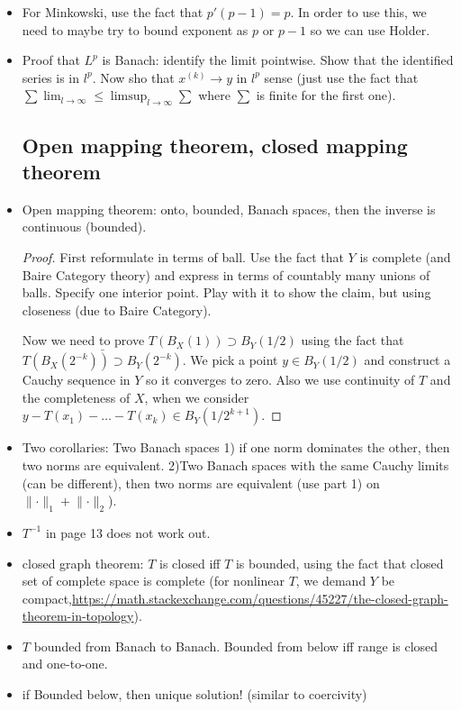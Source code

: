 \documentclass{article}
\theoremstyle{remark}
\begin{document}
\begin{itemize}
\item For Minkowski, use the fact that $p'(p-1)=p$. In order to use this, we need to maybe try to bound exponent as $p$ or $p-1$ so we can use Holder.

\item Proof that $L^p$ is Banach: identify the limit pointwise. Show that the identified series is in $l^p$. Now sho that $x^{(k)}\to y$ in $l^p$ sense (just use the fact that $\sum \lim_{l\to\infty}\leq\limsup_{l\to\infty}\sum$ where $\sum$ is finite for the first one).
\subsection*{Open mapping theorem, closed mapping theorem}
\item Open mapping theorem: onto, bounded, Banach spaces, then the inverse is continuous (bounded).
\begin{proof}
First reformulate in terms of ball. Use the fact that $Y$ is complete (and Baire Category theory) and express in terms of countably many unions of balls. Specify one interior point. Play with it to show the claim, but using closeness (due to Baire Category).

Now we need to prove $T(B_X (1))\supset B_Y(1/2)$ using the fact that $\bar{T(B_X(2^{-k}))\supset B_Y(2^{-k})}$. We pick a point $y\in B_Y(1/2)$ and construct a Cauchy sequence in $Y$ so it converges to zero. Also we use continuity of $T$ and the completeness of $X$, when we consider $y-T(x_1)-\dots-T(x_k)\in B_Y(1/2^{k+1})$.
\end{proof}
\item Two corollaries: Two Banach spaces 1) if one norm dominates the other, then two norms are equivalent. 2)Two Banach spaces with the same Cauchy limits (can be different), then two norms are equivalent (use part 1) on $\lVert\cdot\rVert_1+\lVert\cdot\rVert_2$). 
\item $T^{-1}$ in page 13 does not work out.
\item closed graph theorem: $T$ is closed iff $T$ is bounded, using the fact that closed set of complete space is complete (for nonlinear $T$, we demand $Y$ be compact,\url{https://math.stackexchange.com/questions/45227/the-closed-graph-theorem-in-topology}).
\item $T$ bounded from Banach to Banach. Bounded from below iff range is closed and one-to-one.
\item if Bounded below, then unique solution! (similar to coercivity)

\end{itemize}
\end{document}

